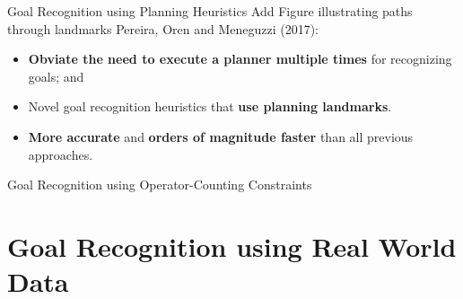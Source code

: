 \documentclass[usenames,dvipsnames]{beamer}
\begin{document}
\begin{frame}[c]{Goal Recognition using Planning Heuristics}
	{\color{red} Add Figure illustrating paths through landmarks}
	Pereira, Oren and Meneguzzi (2017):
   	\begin{itemize}
		\item \textbf{Obviate the need to execute a planner multiple times} for recognizing goals; and
		\item Novel goal recognition heuristics that \textbf{use planning landmarks}.
		\item \textbf{More accurate} and \textbf{orders of magnitude faster} than all previous approaches.
	\end{itemize}
\end{frame}

\begin{frame}[c]{Goal Recognition using Operator-Counting Constraints}
	
\end{frame}


\section{Goal Recognition using Real World Data}
\end{document}
